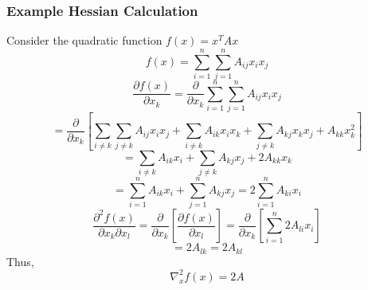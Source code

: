 \documentclass{article}
\begin{document}
\subsubsection{Example Hessian Calculation}
Consider the quadratic function $f(x) = x^TAx$
$$f(x) = \sum_{i=1}^{n} \sum_{j=1}^{n} A_{ij} x_i x_j$$
$$\frac{\partial f(x)}{\partial x_k} = \frac{\partial}{\partial x_k}\sum_{i=1}^{n}\sum_{j=1}^{n} A_{ij} x_i x_j$$
$$= \frac{\partial}{\partial x_k}[\sum_{i \neq k} \sum_{j \neq k} A_{ij} x_i x_j + \sum_{i \neq k} A_{ik} x_i x_k + \sum_{j \neq k} A_{kj} x_k x_j + A_{kk}x_k^2]$$
$$= \sum_{i \neq k} A_{ik} x_i + \sum_{j \neq k} A_{kj} x_j + 2 A_{kk}x_k$$
$$= \sum_{i=1}^{n} A_{ik} x_i + \sum_{j=1}^{n} A_{kj} x_j = 2\sum_{i=1}^{n} A_{ki} x_i$$
$$\frac{\partial^2 f(x)}{\partial x_k \partial x_l} = \frac{\partial}{\partial x_k}[\frac{\partial f(x)}{\partial x_l}] = \frac{\partial}{\partial x_k}[\sum_{i=1}^{n} 2 A_{li} x_i]$$
$$= 2A_{lk} = 2A_{kl}$$
Thus, $$\nabla_x^2 f(x) = 2A$$
% 
% 
\end{document}
